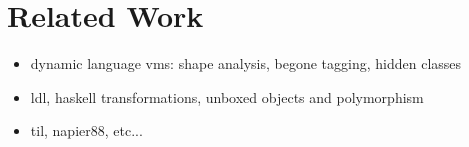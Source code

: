 \section{Related Work}
\label{sec:related}


\begin{itemize}
  \item dynamic language vms: shape analysis, begone tagging, hidden classes
  \item ldl, haskell transformations, unboxed objects and polymorphism
  \item til, napier88, etc...
\end{itemize}

